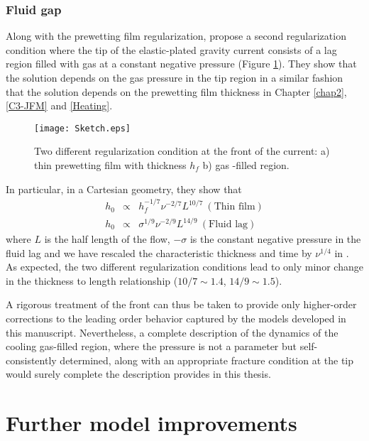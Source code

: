 \subsubsection*{Fluid gap}
\label{sec:fracturation}

Along      with      the     prewetting      film      regularization,
\citet{Anonymous:QWXp_4JV} propose  a second  regularization condition
where the tip of the elastic-plated  gravity current consists of a lag
region  filled  with  gas  at a  constant  negative  pressure  (Figure
\ref{C7-Sketch}).   They show  that the  solution depends  on the  gas
pressure in  the tip  region in  a similar  fashion that  the solution
depends  on  the prewetting  film  thickness  in Chapter  \ref{chap2},
\ref{C3-JFM} and \ref{Heating}.
\begin{figure}[h!]
 \begin{center}
 \graphicspath{ {/Users/thorey/Documents/These/Manuscript/Figure/Chapter7/} }
 \texttt{[image: Sketch.eps]}
 \caption{Two different regularization condition at the front of
 the current: a) thin prewetting film with thickness $h_f$ b) gas
 -filled region.}
 \label{C7-Sketch}
 \end{center}
\end{figure}
In particular, in a Cartesian geometry, they show that
\begin{eqnarray}
 h_0&\propto& h_f^{-1/7}\nu^{-2/7}L^{10/7}~(\text{Thin film})\\
 h_0&\propto& \sigma^{1/9}\nu^{-2/9}L^{14/9}~(\text{Fluid lag})
\end{eqnarray}
where $L$  is the half length  of the flow, $-\sigma$  is the constant
negative  pressure  in  the  fluid   lag  and  we  have  rescaled  the
characteristic    thickness    and     time    by    $\nu^{1/4}$    in
\citet{Anonymous:QWXp_4JV}.   As    expected,   the    two   different
regularization conditions lead  to only minor change  in the thickness
to length relationship ($10/7\sim 1.4$, $14/9\sim 1.5 $).

A rigorous  treatment of the front  can thus be taken  to provide only
higher-order corrections to the leading order behavior captured by the
models  developed   in  this  manuscript.  Nevertheless,   a  complete
description of  the dynamics of  the cooling gas-filled  region, where
the  pressure is  not  a parameter  but self-consistently  determined,
along with an  appropriate fracture condition at the  tip would surely
complete the description provides in this thesis.


\section{Further model improvements}
\label{sec:generalization-model}

